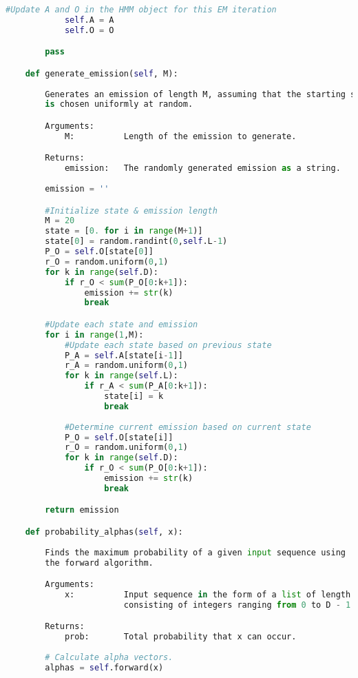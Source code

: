 \begin{lstlisting}[language=Python]
            #Update A and O in the HMM object for this EM iteration                                   
            self.A = A
            self.O = O

        pass

    def generate_emission(self, M):
        
        Generates an emission of length M, assuming that the starting state
        is chosen uniformly at random. 

        Arguments:
            M:          Length of the emission to generate.

        Returns:
            emission:   The randomly generated emission as a string.
        
        emission = ''

        #Initialize state & emission length
        M = 20
        state = [0. for i in range(M+1)]
        state[0] = random.randint(0,self.L-1)
        P_O = self.O[state[0]]
        r_O = random.uniform(0,1)
        for k in range(self.D):
            if r_O < sum(P_O[0:k+1]):
                emission += str(k)
                break

        #Update each state and emission
        for i in range(1,M):
            #Update each state based on previous state
            P_A = self.A[state[i-1]]
            r_A = random.uniform(0,1)            
            for k in range(self.L):
                if r_A < sum(P_A[0:k+1]):
                    state[i] = k
                    break
            
            #Determine current emission based on current state
            P_O = self.O[state[i]]
            r_O = random.uniform(0,1)
            for k in range(self.D):
                if r_O < sum(P_O[0:k+1]):
                    emission += str(k)
                    break

        return emission

    def probability_alphas(self, x):
        
        Finds the maximum probability of a given input sequence using
        the forward algorithm.

        Arguments:
            x:          Input sequence in the form of a list of length M,
                        consisting of integers ranging from 0 to D - 1.

        Returns:
            prob:       Total probability that x can occur.
        
        # Calculate alpha vectors.
        alphas = self.forward(x)


\end{lstlisting}

